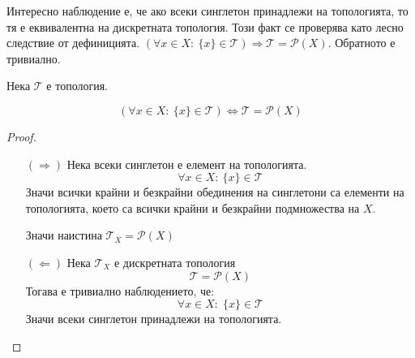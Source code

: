 Интересно наблюдение е, че ако всеки синглетон принадлежи на топологията, то тя е еквивалентна на дискретната топология. Този факт се проверява като лесно следствие от дефиницията. $(\forall x \in X:\ \{x\} \in \mathcal T) \Rightarrow \mathcal T = \mathcal P(X)$. Обратното е тривиално.
\begin{lemma}
    Нека $\mathcal T$ е топология.

    \begin{equation*}
        (\forall x \in X:\ \{x\} \in \mathcal T) \iff \mathcal T = \mathcal P (X)
    \end{equation*}
\end{lemma}
\begin{proof}
    \begin{itemize}
        \item[$(\Rightarrow)$] Нека всеки синглетон е елемент на топологията.
        \begin{equation}
            \forall x \in X:\ \{x\} \in \mathcal T
        \end{equation}
        Значи всички крайни и безкрайни обединения на синглетони са елементи на топологията, което са всички крайни и безкрайни подмножества на $X$.
        
        Значи наистина $\mathcal T_X = \mathcal P (X)$

        \item[$(\Leftarrow)$] Нека $\mathcal T_X$ е дискретната топология
        \begin{equation}
            \mathcal T = \mathcal P (X)
        \end{equation}
        Тогава е тривиално наблюдението, че:
        \begin{equation}
            \forall x \in X:\; \{x\} \in \mathcal T
        \end{equation}
        Значи всеки синглетон принадлежи на топологията.
    \end{itemize}
\end{proof}